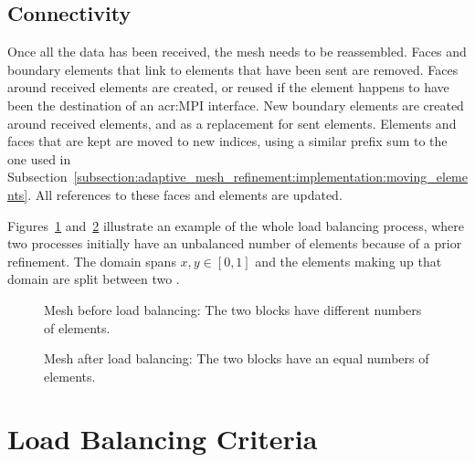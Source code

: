 \subsection{Connectivity}\label{subsection:load_balancing:reconstruction:connectivity}

Once all the data has been received, the mesh needs to be reassembled. Faces and boundary elements
that link to elements that have been sent are removed. Faces around received elements are created,
or reused if the element happens to have been the destination of an \acrshort{acr:MPI} interface.
New boundary elements are created around received elements, and as a replacement for sent elements.
Elements and faces that are kept are moved to new indices, using a similar prefix sum to the one
used in Subsection~\ref{subsection:adaptive_mesh_refinement:implementation:moving_elements}. All
references to these faces and elements are updated.

Figures~\ref{fig:lb_before} and~\ref{fig:lb_after} illustrate an example of the whole load balancing
process, where two processes initially have an unbalanced number of elements because of a prior
refinement. The domain spans \(x, y \in [0, 1]\) and the elements making up that domain are split
between two . 

\begin{figure}[H]
	\centering
	\subfloat[Process 0]
	{\label{fig:lb_before_0}}
	\qquad
	\subfloat[Process 1]
	{\label{fig:lb_before_1}}
	\caption{Mesh before load balancing: The two blocks have different numbers of elements.}\label{fig:lb_before}
\end{figure}

\begin{figure}[H]
	\centering
	\subfloat[Process 0]
	{\label{fig:lb_after_0}}
	\qquad
	\subfloat[Process 1]
	{\label{fig:lb_after_1}}
	\caption{Mesh after load balancing: The two blocks have an equal numbers of elements.}\label{fig:lb_after}
\end{figure}

\section{Load Balancing Criteria}\label{section:load_balancing:criteria}

